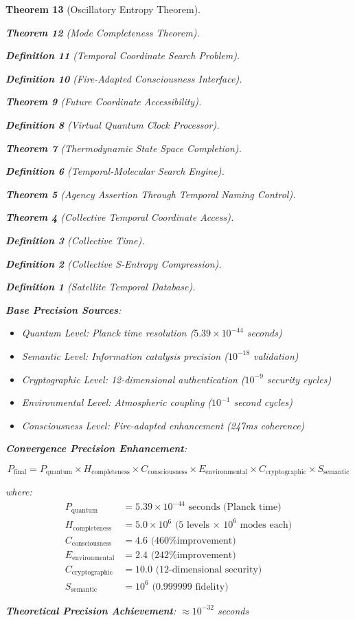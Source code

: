 \documentclass[12pt,a4paper]{article}
\newtheorem{theorem}{Theorem}[section]
\newtheorem{definition}[theorem]{Definition}
\begin{document}
\begin{theorem}[Oscillatory Entropy Theorem]
\begin{theorem}[Mode Completeness Theorem]
\begin{enumerate}
\begin{definition}[Temporal Coordinate Search Problem]
\begin{algorithm}
\begin{definition}[Fire-Adapted Consciousness Interface]
\begin{theorem}[Future Coordinate Accessibility]
\begin{definition}[Virtual Quantum Clock Processor]
\begin{itemize}
\begin{itemize}
\begin{theorem}[Thermodynamic State Space Completion]
\begin{definition}[Temporal-Molecular Search Engine]
\begin{theorem}[Agency Assertion Through Temporal Naming Control]
\begin{remark}
\begin{theorem}[Collective Temporal Coordinate Access]
\begin{definition}[Collective Time]
\begin{definition}[Collective S-Entropy Compression]
\begin{definition}[Satellite Temporal Database]
\begin{algorithm}
\begin{table}[h]
{{\textbf{Base Precision Sources}:
\begin{itemize}
\item Quantum Level: Planck time resolution ($5.39 \times 10^{-44}$ seconds)
\item Semantic Level: Information catalysis precision ($10^{-18}$ validation)
\item Cryptographic Level: 12-dimensional authentication ($10^{-9}$ security cycles)
\item Environmental Level: Atmospheric coupling ($10^{-1}$ second cycles)
\item Consciousness Level: Fire-adapted enhancement (247ms coherence)
\end{itemize}

\textbf{Convergence Precision Enhancement}:

\begin{equation}
P_{\text{final}} = P_{\text{quantum}} \times H_{\text{completeness}} \times C_{\text{consciousness}} \times E_{\text{environmental}} \times C_{\text{cryptographic}} \times S_{\text{semantic}}
\end{equation}

where:
\begin{align}
P_{\text{quantum}} &= 5.39 \times 10^{-44} \text{ seconds (Planck time)} \\
H_{\text{completeness}} &= 5.0 \times 10^6 \text{ (5 levels × 10}^6 \text{ modes each)} \\
C_{\text{consciousness}} &= 4.6 \text{ (460\% improvement)} \\
E_{\text{environmental}} &= 2.4 \text{ (242\% improvement)} \\
C_{\text{cryptographic}} &= 10.0 \text{ (12-dimensional security)} \\
S_{\text{semantic}} &= 10^6 \text{ (0.999999 fidelity)}
\end{align}

\textbf{Theoretical Precision Achievement}: $\approx 10^{-32}$ seconds

}}
\end{table}
\end{algorithm}
\end{definition}
\end{definition}
\end{definition}
\end{theorem}
\end{remark}
\end{theorem}
\end{definition}
\end{theorem}
\end{itemize}
\end{itemize}
\end{definition}
\end{theorem}
\end{definition}
\end{algorithm}
\end{definition}
\end{enumerate}
\end{theorem}
\end{theorem}
\end{document}

